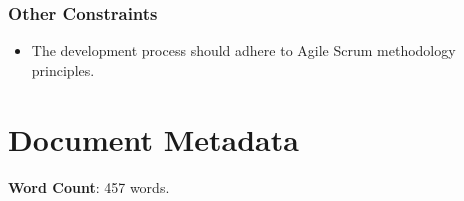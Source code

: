 \documentclass[12pt]{article}
\begin{document}
\subsubsection{Other Constraints}
\begin{itemize}
    \item The development process should adhere to Agile Scrum methodology principles.
\end{itemize}

\newpage %
\section*{Document Metadata}
\textbf{Word Count}: 457 words.
\end{document}
